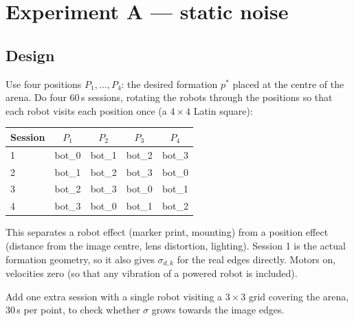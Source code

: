 \documentclass[11pt,a4paper]{article}
\begin{document}
\section{Experiment A --- static noise}
\label{sec:static}

\subsection{Design}
Use four positions $P_1,\dots,P_4$: the desired formation $p^*$ placed at
the centre of the arena. Do four 60\,s sessions, rotating the robots
through the positions so that each robot visits each position once
(a $4\times4$ Latin square):
\begin{center}
\small
\begin{tabular}{@{}lcccc@{}}
\toprule
Session & $P_1$ & $P_2$ & $P_3$ & $P_4$\\
\midrule
1 & bot\_0 & bot\_1 & bot\_2 & bot\_3\\
2 & bot\_1 & bot\_2 & bot\_3 & bot\_0\\
3 & bot\_2 & bot\_3 & bot\_0 & bot\_1\\
4 & bot\_3 & bot\_0 & bot\_1 & bot\_2\\
\bottomrule
\end{tabular}
\end{center}
This separates a robot effect (marker print, mounting) from a position
effect (distance from the image centre, lens distortion, lighting). Session 1
is the actual formation geometry, so it also gives $\sigma_{d,k}$ for the
real edges directly. Motors on, velocities zero (so that any vibration of
a powered robot is included).

Add one extra session with a single robot visiting a $3\times3$ grid
covering the arena, 30\,s per point, to check whether $\sigma$ grows towards
the image edges.
\end{document}
